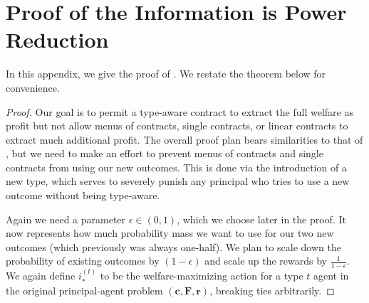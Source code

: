 \documentclass{article}
\newcommand{\costvector}{\bm{c}}
\newcommand{\ForecastTensor}{\bm{F}}
\newcommand{\rewardvector}{\bm{r}}
\newcommand{\PrincipalAgentProblem}{\left(\costvector, \ForecastTensor, \rewardvector\right)}
\newcommand{\OptimalAction}{i_*}
\newcommand{\TypedOptimalAction}[1]{\OptimalAction^{(#1)}}
\begin{document}
\section{Proof of the Information is Power Reduction}
\label{apx:info-is-power}

In this appendix, we give the proof of . We restate the theorem below for convenience.

\infoispowerthm*

\begin{proof}
  Our goal is to permit a type-aware contract to extract the full welfare as profit but not allow menus of contracts, single contracts, or linear contracts to extract much additional profit. The overall proof plan bears similarities to that of , but we need to make an effort to prevent menus of contracts and single contracts from using our new outcomes. This is done via the introduction of a new type, which serves to severely punish any principal who tries to use a new outcome without being type-aware.
  
  Again we need a parameter $\epsilon \in (0, 1)$, which we choose later in the proof. It now represents how much probability mass we want to use for our two new outcomes (which previously was always one-half). We plan to scale down the probability of existing outcomes by $(1 - \epsilon)$ and scale up the rewards by $\frac{1}{1 - \epsilon}$. We again define $\TypedOptimalAction{t}$ to be the welfare-maximizing action for a type $t$ agent in the original principal-agent problem $\PrincipalAgentProblem$, breaking ties arbitrarily.
  

\end{proof}
\end{document}
